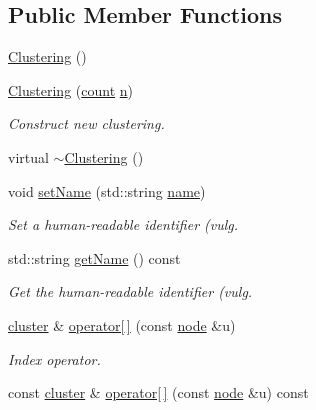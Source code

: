 \subsection*{Public Member Functions}
\begin{DoxyCompactItemize}
\item 
\hyperlink{class_networ_kit_1_1_clustering_a7126c414985b7d9ef91b24fb0e4fc521}{Clustering} ()
\item 
\hyperlink{class_networ_kit_1_1_clustering_a9df7e0e888aa4e1f4f7a1138e63ca468}{Clustering} (\hyperlink{namespace_networ_kit_a76b399edfa50ae72e4aa86007aaa800a}{count} \hyperlink{class_networ_kit_1_1_index_map_abffdb945755f2789f33b5eb6e95430d8}{n})
\begin{DoxyCompactList}\small\item\em Construct new clustering. \end{DoxyCompactList}\item 
virtual \hyperlink{class_networ_kit_1_1_clustering_afbc84dc6577e2ee74c48c790bc61a7b4}{$\sim$\-Clustering} ()
\item 
void \hyperlink{class_networ_kit_1_1_clustering_a5be82c60354b7e9652df63567ad7de63}{set\-Name} (std\-::string \hyperlink{class_networ_kit_1_1_clustering_af87d62813784536f46ed1582317d05f5}{name})
\begin{DoxyCompactList}\small\item\em Set a human-\/readable identifier (vulg. \end{DoxyCompactList}\item 
std\-::string \hyperlink{class_networ_kit_1_1_clustering_a3229e9863df6727cd2900e4418295e7e}{get\-Name} () const 
\begin{DoxyCompactList}\small\item\em Get the human-\/readable identifier (vulg. \end{DoxyCompactList}\item 
\hyperlink{namespace_networ_kit_a189884f50c41226806b31842d2214b71}{cluster} \& \hyperlink{class_networ_kit_1_1_clustering_ad6152fce1c5e9be7906895495e7faa6e}{operator\mbox{[}$\,$\mbox{]}} (const \hyperlink{namespace_networ_kit_a53fe3e4fd04ea024160e4d024dfebadf}{node} \&u)
\begin{DoxyCompactList}\small\item\em Index operator. \end{DoxyCompactList}\item 
const \hyperlink{namespace_networ_kit_a189884f50c41226806b31842d2214b71}{cluster} \& \hyperlink{class_networ_kit_1_1_clustering_aae9dd5303831724e62081bf4d4f9ff07}{operator\mbox{[}$\,$\mbox{]}} (const \hyperlink{namespace_networ_kit_a53fe3e4fd04ea024160e4d024dfebadf}{node} \&u) const 

\end{DoxyCompactItemize}
